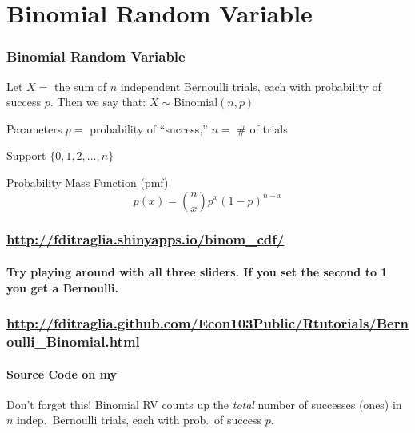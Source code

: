 \section{Binomial Random Variable}

\begin{frame}
\frametitle{Binomial Random Variable}
Let $X = $ the sum of $n$ independent Bernoulli trials, each with probability of success $p$.  \alert{Then we say that:
		$X \sim \mbox{Binomial}(n,p)$} 

\vspace{2em}
\begin{block}{Parameters}
$p =$ probability of ``success,'' $n=$ \# of trials
\end{block}
\begin{block}{Support} 
$\{0, 1, 2, \hdots, n\}$ 
\end{block}
\begin{block}{Probability Mass Function (pmf)} 
$$p(x) = {n \choose x} p^x (1-p)^{n-x}$$ 
\end{block}
\end{frame}

\begin{frame}
	\frametitle{\href{https://fditraglia.shinyapps.io/binom_cdf/}{http://fditraglia.shinyapps.io/binom\_cdf/}}
\framesubtitle{Try playing around with all three sliders. If you set the second to 1 you get a Bernoulli.}

\begin{figure}
\end{figure}

\end{frame}



\begin{frame}
	\frametitle{\href{http://fditraglia.github.com/Econ103Public/Rtutorials/Bernoulli_Binomial.html}{\small http://fditraglia.github.com/Econ103Public/Rtutorials/Bernoulli\_Binomial.html}}

\framesubtitle{Source Code on my \href{https://github.com/fditraglia/Econ103Public/blob/master/Rtutorials/Bernoulli_Binomial.R}{}}



\begin{figure}
\end{figure}

\begin{alertblock}{Don't forget this!}
 Binomial RV counts up the \emph{total} number of successes (ones) in $n$ indep.\ Bernoulli trials, each with prob.\ of success $p$.
\end{alertblock}

\end{frame}

